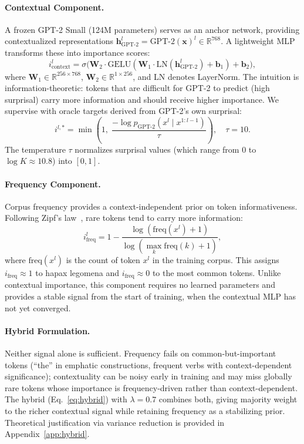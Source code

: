 \documentclass[11pt]{article}
\newcommand{\rvx}{\mathbf{x}}
\newcommand{\rvh}{\mathbf{h}}
\newcommand{\R}{\mathbb{R}}
\newcommand{\sigmoid}{\sigma}
\theoremstyle{remark}
\begin{document}
\paragraph{Contextual Component.} A frozen GPT-2 Small (124M parameters) serves as an anchor network, providing contextualized representations $\rvh^l_{\text{GPT-2}} = \text{GPT-2}(\rvx)^l \in \R^{768}$. A lightweight MLP transforms these into importance scores:
\begin{equation}
    i^l_{\text{context}} = \sigmoid\!\bigl(\mathbf{W}_2 \cdot \text{GELU}(\mathbf{W}_1 \cdot \text{LN}(\rvh^l_{\text{GPT-2}}) + \mathbf{b}_1) + \mathbf{b}_2\bigr),
\end{equation}
where $\mathbf{W}_1 \in \R^{256 \times 768}$, $\mathbf{W}_2 \in \R^{1 \times 256}$, and LN denotes LayerNorm. The intuition is information-theoretic: tokens that are difficult for GPT-2 to predict (high surprisal) carry more information and should receive higher importance. We supervise with oracle targets derived from GPT-2's own surprisal:
\begin{equation}
    i^{l,*} = \min\!\left(1,\; \frac{-\log p_{\text{GPT-2}}(x^l \mid x^{1:l-1})}{\tau}\right)\!, \quad \tau = 10.
    \label{eq:oracle}
\end{equation}
The temperature $\tau$ normalizes surprisal values (which range from 0 to $\log K \approx 10.8$) into $[0,1]$.

\paragraph{Frequency Component.} Corpus frequency provides a context-independent prior on token informativeness. Following Zipf's law~\citep{zipf1949human}, rare tokens tend to carry more information:
\begin{equation}
    i^l_{\text{freq}} = 1 - \frac{\log(\text{freq}(x^l)+1)}{\log(\max_k\text{freq}(k)+1)},
\end{equation}
where $\text{freq}(x^l)$ is the count of token $x^l$ in the training corpus. This assigns $i_{\text{freq}} \approx 1$ to hapax legomena and $i_{\text{freq}} \approx 0$ to the most common tokens. Unlike contextual importance, this component requires no learned parameters and provides a stable signal from the start of training, when the contextual MLP has not yet converged.

\paragraph{Hybrid Formulation.} Neither signal alone is sufficient. Frequency fails on common-but-important tokens (``the'' in emphatic constructions, frequent verbs with context-dependent significance); contextuality can be noisy early in training and may miss globally rare tokens whose importance is frequency-driven rather than context-dependent. The hybrid (Eq.~\ref{eq:hybrid}) with $\lambda = 0.7$ combines both, giving majority weight to the richer contextual signal while retaining frequency as a stabilizing prior. Theoretical justification via variance reduction is provided in Appendix~\ref{app:hybrid}.
\end{document}
